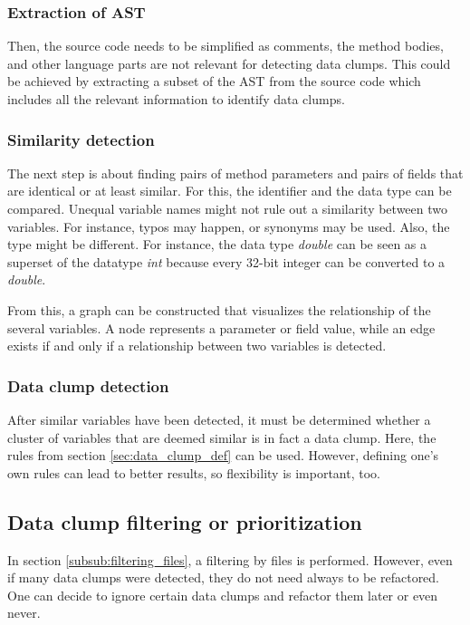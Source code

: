 \subsubsection{Extraction of AST}
Then,  the source code needs to be simplified as comments, the method bodies, and other language parts are not relevant for detecting data clumps. This could be achieved by extracting a subset of the \ac{AST} from the source code which includes all the relevant information to identify data clumps.
\subsubsection{Similarity detection}

The next step is about finding pairs of method parameters and pairs of fields that are identical or at least similar. For this, the identifier and the  data type can be compared. Unequal variable names might not rule out a similarity between two variables. For instance, typos may happen, or synonyms may be used. Also, the type might be different. For instance, the data type \textit{double} can be seen as a superset of the datatype \textit{int} because every 32-bit integer can be converted to a \textit{double}.

From this, a graph can be constructed that visualizes the relationship of the several variables. A node represents a parameter or field value, while an edge exists if and only if a relationship between two variables is detected. 

\subsubsection{Data clump detection}
After similar variables have been detected, it must be determined whether a cluster of variables that are deemed similar is in fact a data clump. Here, the rules from section \ref{sec:data_clump_def} can be used. However, defining one's own rules can lead to better results, so flexibility is important, too. 

\subsection{Data clump filtering or prioritization} \label{subsub:filtering_data_clumps}
In section \ref{subsub:filtering_files}, a filtering by files is performed. However, even if many data clumps were detected, they do not need always to be refactored. One can decide to ignore certain data clumps and refactor them later or even never. 

